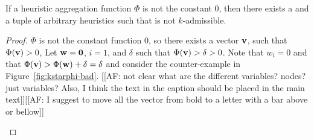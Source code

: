 \begin{theorem}
  \label{thm:arbitrary-dual}
  If a heuristic aggregation function $\Phi$ is not the constant 0, then there exists a \kgs and a tuple of arbitrary heuristics such that \kastarphi is not $k$-admissible.
\end{theorem}
\begin{proof}
  $\Phi$ is not the constant function 0, so there exists a vector $\mathbf{v}$, such that $\Phi(\mathbf{v}) > 0$,
  Let $\mathbf{w} = \mathbf{0}$, $i = 1$, and $\delta$ such that $\Phi(\mathbf{v}) > \delta > 0$.
  Note that $w_i = 0$ and that $\Phi(\mathbf{v}) > \Phi(\mathbf{w}) + \delta = \delta$ and consider the counter-example in Figure~\ref{fig:kstarphi-bad}. [[AF: not clear what are the different variables? nodes? just variables? Also, I think the text in the caption should be placed in the main text]][[AF: I suggest to move all the vector from bold to a letter with a bar above or bellow]]
\begin{figure}
  \centering
\end{figure}
\end{proof}

